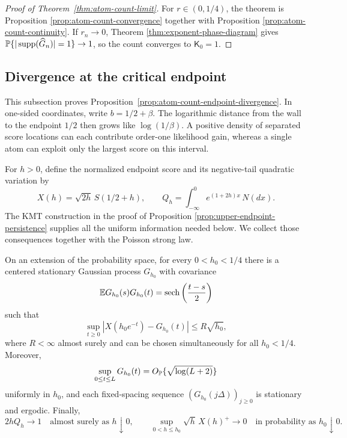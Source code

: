 \begin{proof}[Proof of Theorem~\ref{thm:atom-count-limit}]
For \(r\in(0,1/4)\), the theorem is Proposition
\ref{prop:atom-count-convergence} together with Proposition
\ref{prop:atom-count-continuity}. If \(r_n\to0\), Theorem
\ref{thm:exponent-phase-diagram} gives
\(\mathbb{P}\{|\operatorname{supp}(\widehat G_n)|=1\}\to1\), so the count converges to
\(\mathsf K_0=1\).
\end{proof}

\subsection{Divergence at the critical endpoint}

This subsection proves
Proposition~\ref{prop:atom-count-endpoint-divergence}. In one-sided
coordinates, write
\(b=1/2+\beta\). The logarithmic distance from the wall to the endpoint
\(1/2\) then grows like \(\log(1/\beta)\). A positive density of separated
score locations can each contribute order-one likelihood gain, whereas a
single atom can exploit only the largest score on this interval.

For \(h>0\), define the normalized endpoint score and its negative-tail
quadratic variation by
\[
    X(h)=\sqrt{2h}\,S(1/2+h),
    \qquad
    Q_h=\int_{-\infty}^0e^{(1+2h)x}\,N(dx).
\]
The KMT construction in the proof of Proposition
\ref{prop:upper-endpoint-persistence} supplies all the uniform information
needed below. We collect those consequences together with the Poisson strong
law.
\begin{lemma}
\label{lem:atom-endpoint-control}
On an extension of the probability space, for every \(0<h_0<1/4\) there is
a centered stationary Gaussian process \(G_{h_0}\) with covariance
\[
    \mathbb{E} G_{h_0}(s)G_{h_0}(t)
    =\operatorname{sech}\left(\frac{t-s}{2}\right)
\]
such that
\[
    \sup_{t\ge0}|X(h_0e^{-t})-G_{h_0}(t)|
    \le R\sqrt{h_0},
\]
where \(R<\infty\) almost surely and can be chosen simultaneously for all
\(h_0<1/4\). Moreover,
\[
    \sup_{0\le t\le L}G_{h_0}(t)
       =O_{\mathbb{P}}\{\sqrt{\log(L+2)}\}
\]
uniformly in \(h_0\), and each fixed-spacing sequence
\((G_{h_0}(j\Delta))_{j\ge0}\) is stationary and ergodic. Finally,
\[
    2hQ_h\longrightarrow1\quad\text{almost surely as }h\downarrow0,
    \qquad
    \sup_{0<h\le h_0}\sqrt h\,X(h)^+\longrightarrow0
       \quad\text{in probability as }h_0\downarrow0.
\]
\end{lemma}

